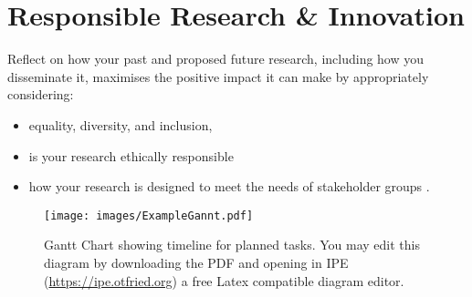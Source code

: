 \documentclass[11pt,a4paper]{article}
\begin{document}
\section{Responsible Research \& Innovation}
Reflect on how your past and proposed future research, including how you disseminate it, maximises the positive impact it can make by appropriately considering:
\begin{itemize}
    \item equality, diversity, and inclusion, 
    \item is your research ethically responsible 
    \item how your research is designed to meet the needs of stakeholder groups . 
\end{itemize}




\begin{landscape}
\begin{figure}
\texttt{[image: images/ExampleGannt.pdf]}
\caption{Gantt Chart showing timeline for planned tasks. You may edit this diagram by downloading the PDF and opening in IPE (\url{https://ipe.otfried.org}) a free Latex compatible diagram editor.\label{fig:Gantt}}
\end{figure}
\end{landscape}


\clearpage


\end{document}
